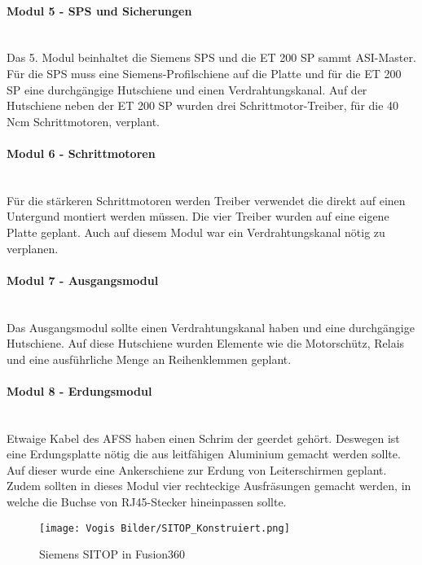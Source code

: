     \paragraph{Modul 5 - SPS und Sicherungen}\mbox{}\\
    Das 5. Modul beinhaltet die Siemens SPS und die ET 200 SP sammt ASI-Master. Für die SPS muss eine Siemens-Profilschiene auf die Platte und für die ET 200 SP eine durchgängige Hutschiene und einen Verdrahtungskanal. Auf der Hutschiene neben der ET 200 SP wurden drei Schrittmotor-Treiber, für die 40 Ncm Schrittmotoren, verplant.
    \paragraph{Modul 6 - Schrittmotoren}\mbox{}\\
    Für die stärkeren Schrittmotoren werden Treiber verwendet die direkt auf einen Untergund montiert werden müssen. Die vier Treiber wurden auf eine eigene Platte geplant. Auch auf diesem Modul war ein Verdrahtungskanal nötig zu verplanen.
    \paragraph{Modul 7 - Ausgangsmodul}\mbox{}\\
    Das Ausgangsmodul sollte einen Verdrahtungskanal haben und eine durchgängige Hutschiene. Auf diese Hutschiene wurden Elemente wie die Motorschütz, Relais und eine ausführliche Menge an Reihenklemmen geplant.
    \paragraph{Modul 8 - Erdungsmodul}\mbox{}\\
    Etwaige Kabel des AFSS haben einen Schrim der geerdet gehört. Deswegen ist eine Erdungsplatte nötig die aus leitfähigen Aluminium gemacht werden sollte. Auf dieser wurde eine Ankerschiene zur Erdung von Leiterschirmen geplant. Zudem sollten in dieses Modul vier rechteckige Ausfräsungen gemacht werden, in welche die Buchse von RJ45-Stecker hineinpassen sollte.
    \begin{figure}[h]
        \centering
        \texttt{[image: Vogis Bilder/SITOP\_Konstruiert.png]}
        \caption{Siemens SITOP in Fusion360}
        \label{fig:SITOP_Konstrueiert}
    \end{figure}
